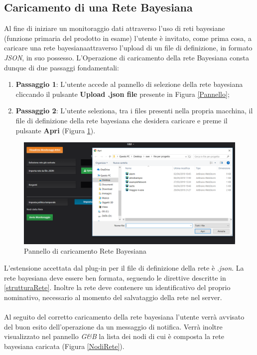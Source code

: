 \subsection{Caricamento di una Rete Bayesiana}\label{ReteB}

Al fine di iniziare un monitoraggio dati attraverso l'uso di reti bayesiane (funzione primaria del prodotto in esame) l'utente è invitato, come prima cosa, a caricare una rete bayesiana\glossario attraverso l'upload di un file di definizione, in formato \textit{JSON}\glossario, in suo possesso. L'Operazione di caricamento della rete Bayesiana consta dunque di due passaggi fondamentali:
\begin{enumerate}
	\item \textbf{Passaggio 1}: L'utente accede al pannello di selezione della rete bayesiana cliccando il pulsante \textbf{Upload .json file} presente in Figura \ref{Pannello};
	\item \textbf{Passaggio 2}: L'utente seleziona, tra i files presenti nella propria macchina, il file di definizione della rete bayesiana che desidera caricare e preme il pulsante \textbf{Apri} (Figura \ref{UploadRete}).
\end{enumerate} 

\begin{figure}[H]
	\begin{center}
		\includegraphics[scale=0.5]{./images/UpRete.png}
		 \caption{Pannello di caricamento Rete Bayesiana}	
		 \label{UploadRete}
	\end{center}
\end{figure}

L'estensione accettata dal plug-in per il file di definizione della rete è \textit{.json}. La rete bayesiana deve essere ben formata, seguendo le direttive descritte in \ref{strutturaRete}. Inoltre la rete deve contenere un identificativo del proprio nominativo, necessario al momento del salvataggio della rete nel server.\\
~\\
Al seguito del corretto caricamento della rete bayesiana l'utente verrà avvisato del buon esito dell'operazione da un messaggio di notifica. Verrà inoltre visualizzato nel pannello \textit{G\&B} la lista dei nodi di cui è composta la rete bayesiana caricata (Figura \ref{NodiRete}).

